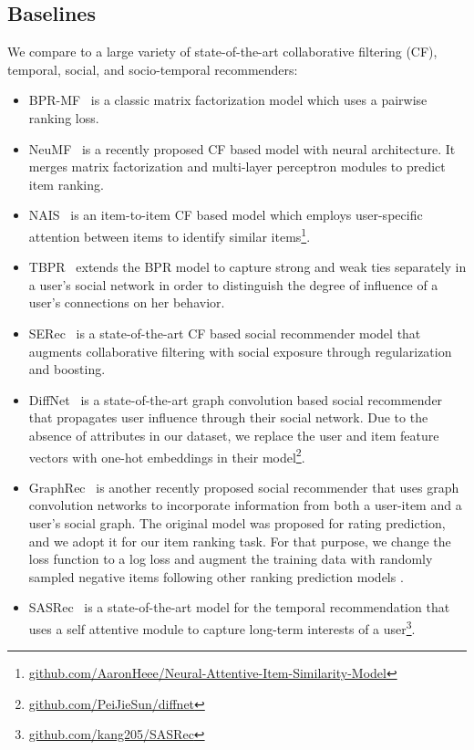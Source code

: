 \subsection{Baselines}
We compare to a large variety of state-of-the-art collaborative filtering (CF), temporal, social, and socio-temporal recommenders:
\begin{itemize}
\item BPR-MF~\cite{Rendle} is a classic matrix factorization model which uses a pairwise ranking loss.
\item NeuMF~\cite{NeuMF} is a recently proposed CF based model with neural architecture. It merges matrix factorization and multi-layer perceptron modules to predict item ranking.
\item NAIS~\cite{NAIS} is an item-to-item CF based model which employs user-specific attention between items to identify similar items\footnote{\url{github.com/AaronHeee/Neural-Attentive-Item-Similarity-Model}}.
\item TBPR~\cite{TBPR} extends the BPR model to capture strong and weak ties separately in a user's social network in order to distinguish the degree of influence of a user's connections on her behavior.
\item SERec~\cite{SERec} is a state-of-the-art CF based social recommender model that augments collaborative filtering with social exposure through regularization and boosting.
\item DiffNet~\cite{Diffnet} is a state-of-the-art graph convolution based social recommender that propagates user influence through their social network. Due to the absence of attributes in our dataset, we replace the user and item feature vectors with one-hot embeddings in their model\footnote{\url{github.com/PeiJieSun/diffnet}}.

\item GraphRec~\cite{fan2019} is another recently proposed social recommender that uses graph convolution networks to incorporate information from both a user-item and a user's social graph.
The original model was proposed for rating prediction, and we adopt it for our item ranking task. For that purpose, we change the loss function to a log loss and augment the training data with randomly sampled negative items following other ranking prediction models \cite{NeuMF}.

\item SASRec~\cite{SAS:2018} is a state-of-the-art model for the temporal recommendation that uses a self attentive module to capture long-term interests of a user\footnote{\url{github.com/kang205/SASRec}}.


\end{itemize}
